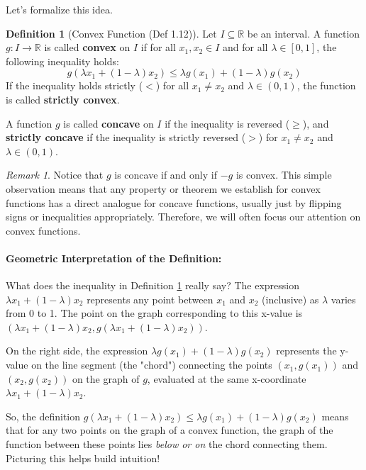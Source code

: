 \documentclass[11pt]{article}
\theoremstyle{definition}
\newtheorem{definition}[theorem]{Definition}
\theoremstyle{remark}
\newtheorem{remark}[theorem]{Remark}
\newcommand{\lambdaa}{\lambda} %
\begin{document}
Let's formalize this idea.

\begin{definition}[Convex Function (Def 1.12)] \label{def:convex}
Let $I \subseteq \mathbb{R}$ be an interval. A function $g: I \to \mathbb{R}$ is called \textbf{convex} on $I$ if for all $x_1, x_2 \in I$ and for all $\lambdaa \in [0, 1]$, the following inequality holds:
\[
g(\lambdaa x_1 + (1-\lambdaa) x_2) \le \lambdaa g(x_1) + (1-\lambdaa) g(x_2)
\]
If the inequality holds strictly ($<$) for all $x_1 \neq x_2$ and $\lambdaa \in (0, 1)$, the function is called \textbf{strictly convex}.

A function $g$ is called \textbf{concave} on $I$ if the inequality is reversed ($\ge$), and \textbf{strictly concave} if the inequality is strictly reversed ($>$) for $x_1 \neq x_2$ and $\lambdaa \in (0, 1)$.
\end{definition}

\begin{remark}
Notice that $g$ is concave if and only if $-g$ is convex. This simple observation means that any property or theorem we establish for convex functions has a direct analogue for concave functions, usually just by flipping signs or inequalities appropriately. Therefore, we will often focus our attention on convex functions.
\end{remark}

\paragraph{Geometric Interpretation of the Definition:}
What does the inequality in Definition \ref{def:convex} really say? The expression $\lambdaa x_1 + (1-\lambdaa) x_2$ represents any point between $x_1$ and $x_2$ (inclusive) as $\lambdaa$ varies from 0 to 1. The point on the graph corresponding to this x-value is $( \lambdaa x_1 + (1-\lambdaa) x_2, g(\lambdaa x_1 + (1-\lambdaa) x_2) )$.

On the right side, the expression $\lambdaa g(x_1) + (1-\lambdaa) g(x_2)$ represents the y-value on the line segment (the "chord") connecting the points $(x_1, g(x_1))$ and $(x_2, g(x_2))$ on the graph of $g$, evaluated at the same x-coordinate $\lambdaa x_1 + (1-\lambdaa) x_2$.

So, the definition $g(\lambdaa x_1 + (1-\lambdaa) x_2) \le \lambdaa g(x_1) + (1-\lambdaa) g(x_2)$ means that for any two points on the graph of a convex function, the graph of the function between these points lies \emph{below or on} the chord connecting them. Picturing this helps build intuition!
\end{document}
